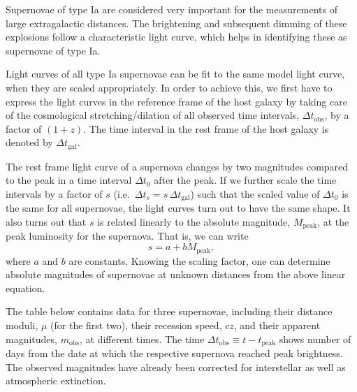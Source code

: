 Supernovae of type Ia are considered very important for the measurements of
large extragalactic distances. The brightening and subsequent dimming of these
explosions follow a characteristic light curve, which helps in identifying
these as supernovae of type Ia.

Light curves of all type Ia supernovae can be fit to the same model light
curve, when they are scaled appropriately. In order to achieve this, we first
have to express the light curves in the reference frame of the host galaxy by
taking care of the cosmological stretching/dilation of all observed time
intervals, $\Delta t_{\mathrm{obs}}$, by a factor of $(1+z)$. The time
interval in the rest frame of the host galaxy is denoted by
$\Delta t_{\mathrm{gal}}$.

The rest frame light curve of a supernova changes by two magnitudes compared
to the peak in a time interval $\Delta t_0$ after the peak. If we further
scale the time intervals by a factor of $s$ (i.e.\
$\Delta t_s = s\,\Delta t_{\mathrm{gal}}$) such that the scaled value of
$\Delta t_0$ is the same for all supernovae, the light curves turn out to have
the same shape. It also turns out that $s$ is related linearly to the absolute
magnitude, $M_{\mathrm{peak}}$, at the peak luminosity for the supernova. That
is, we can write
\[ s = a + b M_{\mathrm{peak}}, \]
where $a$ and $b$ are constants. Knowing the scaling factor, one can determine
absolute magnitudes of supernovae at unknown distances from the above linear
equation.

The table below contains data for three supernovae, including their distance
moduli, $\mu$ (for the first two), their recession speed, $cz$, and their
apparent magnitudes, $m_{\mathrm{obs}}$, at different times. The time
$\Delta t_{\mathrm{obs}} \equiv t - t_{\mathrm{peak}}$ shows number of days
from the date at which the respective supernova reached peak brightness. The
observed magnitudes have already been corrected for interstellar as well as
atmospheric extinction.

